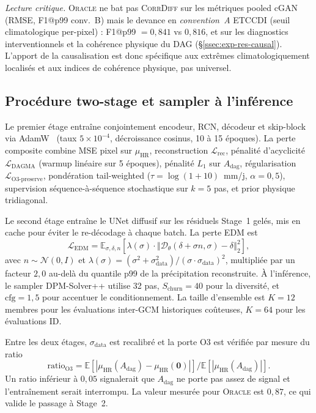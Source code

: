 \documentclass[14pt,a4paper,openany]{extreport}
\theoremstyle{definition}
\newcommand{\Oracle}{\textsc{Oracle}}
\newcommand{\CorrDiff}{\textsc{CorrDiff}}
\newcommand{\HR}{\ensuremath{\text{HR}}}
\newcommand{\muHR}{\ensuremath{\mu_{\HR}}}
\newcommand{\Adag}{\ensuremath{A_{\mathrm{dag}}}}
\begin{document}
\emph{Lecture critique.} \Oracle{} ne bat pas \CorrDiff{} sur les métriques pooled cGAN (RMSE, F1@p99 conv.~B) mais le devance en \emph{convention~A} ETCCDI (seuil climatologique per-pixel) : F1@p99 $= 0{,}841$ vs $0{,}816$, et sur les diagnostics interventionnels et la cohérence physique du DAG (\S\ref{ssec:exp-res-causal}). L'apport de la causalisation est donc spécifique aux extrêmes climatologiquement localisés et aux indices de cohérence physique, pas universel.

\subsection{Procédure two-stage et sampler à l'inférence}
\label{ssec:exp-traj-procedure}

Le premier étage entraîne conjointement encodeur, RCN, décodeur et skip-block via AdamW~\cite{loshchilov_adamw_2019} (taux $5 \times 10^{-4}$, décroissance cosinus, 10 à 15 époques). La perte composite combine MSE pixel sur $\muHR$, reconstruction $\mathcal{L}_{\mathrm{rec}}$, pénalité d'acyclicité $\mathcal{L}_{\mathrm{DAGMA}}$ (warmup linéaire sur 5 époques), pénalité $L_1$ sur $\Adag$, régularisation $\mathcal{L}_{\mathrm{O3\text{-}preserve}}$, pondération tail-weighted ($\tau = \log(1 + 10)$~mm/j, $\alpha = 0{,}5$), supervision séquence-à-séquence stochastique sur $k = 5$ pas, et prior physique tridiagonal.

Le second étage entraîne le UNet diffusif sur les résiduels Stage~1 gelés, mis en cache pour éviter le re-décodage à chaque batch. La perte EDM est
\begin{equation}
  \mathcal{L}_{\mathrm{EDM}} = \mathbb{E}_{\sigma, \delta, n} \left[ \lambda(\sigma) \cdot \left\Vert \mathcal{D}_\theta(\delta + \sigma n, \sigma) - \delta \right\Vert_2^2 \right],
  \label{eq:exp-edm-loss}
\end{equation}
avec $n \sim \mathcal{N}(0, I)$ et $\lambda(\sigma) = (\sigma^2 + \sigma_{\mathrm{data}}^2) / (\sigma \cdot \sigma_{\mathrm{data}})^2$, multipliée par un facteur $2{,}0$ au-delà du quantile p99 de la précipitation reconstruite. À l'inférence, le sampler DPM-Solver++ utilise 32 pas, $S_{\mathrm{churn}} = 40$ pour la diversité, et $\mathrm{cfg} = 1{,}5$ pour accentuer le conditionnement. La taille d'ensemble est $K = 12$ membres pour les évaluations inter-GCM historiques coûteuses, $K = 64$ pour les évaluations ID.

Entre les deux étages, $\sigma_{\mathrm{data}}$ est recalibré et la porte O3 est vérifiée par mesure du ratio
\begin{equation}
  \mathrm{ratio}_{\mathrm{O3}} = \mathbb{E}\left[ \left\vert \muHR(\Adag) - \muHR(\mathbf{0}) \right\vert \right] / \mathbb{E}\left[ \left\vert \muHR(\Adag) \right\vert \right].
  \label{eq:exp-gate-o3}
\end{equation}
Un ratio inférieur à $0{,}05$ signalerait que $\Adag$ ne porte pas assez de signal et l'entraînement serait interrompu. La valeur mesurée pour \Oracle{} est $0{,}87$, ce qui valide le passage à Stage~2.
\end{document}
